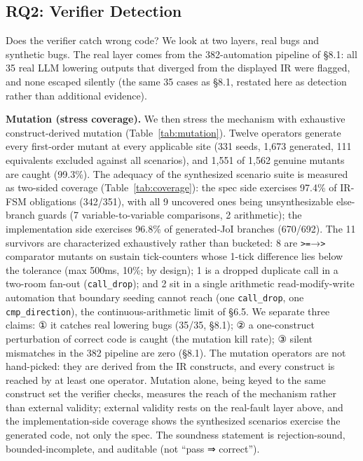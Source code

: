 \documentclass[sigconf,nonacm,anonymous,review]{acmart}
\begin{document}
\subsection{RQ2: Verifier Detection}

Does the verifier catch wrong code? We look at two layers, real bugs and synthetic bugs. The real layer comes from the 382-automation pipeline of \S8.1: all 35 real LLM lowering outputs that diverged from the displayed IR were flagged, and none escaped silently (the same 35 cases as \S8.1, restated here as detection rather than additional evidence).

\textbf{Mutation (stress coverage).} We then stress the mechanism with exhaustive construct-derived mutation (Table~\ref{tab:mutation}). Twelve operators generate every first-order mutant at every applicable site (331 seeds, 1,673 generated, 111 equivalents excluded against all scenarios), and 1,551 of 1,562 genuine mutants are caught (99.3\%). The adequacy of the synthesized scenario suite is measured as two-sided coverage (Table~\ref{tab:coverage}): the spec side exercises 97.4\% of IR-FSM obligations (342/351), with all 9 uncovered ones being unsynthesizable else-branch guards (7 variable-to-variable comparisons, 2 arithmetic); the implementation side exercises 96.8\% of generated-JoI branches (670/692). The 11 survivors are characterized exhaustively rather than bucketed: 8 are \texttt{>=}→\texttt{>} comparator mutants on sustain tick-counters whose 1-tick difference lies below the tolerance (max 500ms, 10\%; by design); 1 is a dropped duplicate call in a two-room fan-out (\texttt{call\_drop}); and 2 sit in a single arithmetic read-modify-write automation that boundary seeding cannot reach (one \texttt{call\_drop}, one \texttt{cmp\_direction}), the continuous-arithmetic limit of \S6.5. We separate three claims: ① it catches real lowering bugs (35/35, \S8.1); ② a one-construct perturbation of correct code is caught (the mutation kill rate); ③ silent mismatches in the 382 pipeline are zero (\S8.1). The mutation operators are not hand-picked: they are derived from the IR constructs, and every construct is reached by at least one operator. Mutation alone, being keyed to the same construct set the verifier checks, measures the reach of the mechanism rather than external validity; external validity rests on the real-fault layer above, and the implementation-side coverage shows the synthesized scenarios exercise the generated code, not only the spec. The soundness statement is rejection-sound, bounded-incomplete, and auditable (not ``pass ⇒ correct'').
\end{document}
